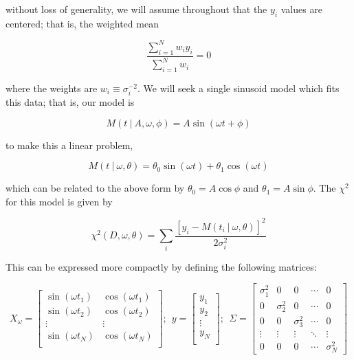 \documentclass[12pt,preprint]{aastex}
\begin{document}
without loss of generality, we will assume throughout that the $y_i$ values are centered; that is, the weighted mean

\begin{equation}
  \label{eq:centered-data}
  \frac{\sum_{i=1}^N w_i y_i}{\sum_{i=1}^N w_i} = 0
\end{equation}

where the weights are $w_i \equiv \sigma_i^{-2}$. We will seek a single sinusoid model which fits this data; that is, our model is

\begin{equation}
M(t~|~A,\omega,\phi) = A \sin(\omega t + \phi)
\end{equation}

to make this a linear problem,

\begin{equation}
M(t~|~\omega,\theta) = \theta_0 \sin(\omega t) + \theta_1\cos(\omega t)
\end{equation}

which can be related to the above form by $\theta_0 = A\cos\phi$ and $\theta_1 = A\sin\phi$.
The $\chi^2$ for this model is given by

\begin{equation}
\chi^2(D, \omega, \theta) = \sum_i\frac{[y_i - M(t_i~|~\omega,\theta)]^2}{2\sigma_i^2}
\end{equation}

This can be expressed more compactly by defining the following matrices:

\begin{equation}
X_\omega = \left[
\begin{array}{cc}
\sin(\omega t_1) & \cos(\omega t_1)\\
\sin(\omega t_2) & \cos(\omega t_2)\\
\vdots & \vdots \\
\sin(\omega t_N) & \cos(\omega t_N)\\
\end{array}
\right];~~
y = \left[
\begin{array}{c}
y_1 \\
y_2\\
\vdots \\
y_N\\
\end{array}
\right];~~
\Sigma = \left[
\begin{array}{ccccc}
\sigma_1^2 & 0 & 0 & \cdots & 0\\
0 & \sigma_2^2 & 0 & \cdots & 0\\
0 & 0 & \sigma_3^2 & \cdots & 0\\
\vdots & \vdots & \vdots & \ddots & \vdots\\
0 & 0 & 0 & \cdots & \sigma_N^2
\end{array}
\right]
\end{equation}
\end{document}
